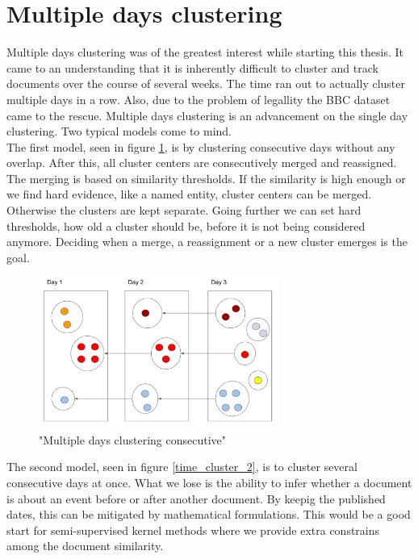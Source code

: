 \section{Multiple days clustering}
  Multiple days clustering was of the greatest interest while starting this thesis. It came to an understanding that it is inherently difficult to cluster and track documents over the course of several weeks. The time ran out to actually cluster multiple days in a row. Also, due to the problem of legallity the BBC dataset came to the rescue. Multiple days clustering is an advancement on the single day clustering. Two typical models come to mind.\\ 

  The first model, seen in figure \ref{time_cluster_1}, is by clustering consecutive days without any overlap. After this, all cluster centers are consecutively merged and reassigned. The merging is based on similarity thresholds. If the similarity is high enough or we find hard evidence, like a named entity, cluster centers can be merged. Otherwise the clusters are kept separate. Going further we can set hard thresholds, how old a cluster should be, before it is not being considered anymore. Deciding when a merge, a reassignment or a new cluster emerges is the goal.

    \begin{figure}[h!]
      \centering
        \includegraphics[width=0.7\textwidth]{time_cluster_1.png}
        \caption{"Multiple days clustering consecutive"}
        \label{time_cluster_1}
    \end{figure} 

  The second model, seen in figure \ref{time_cluster_2}, is to cluster several consecutive days at once. What we lose is the ability to infer whether a document is about an event before or after another document. By keepig the published dates, this can be mitigated by mathematical formulations. This would be a good start for semi-supervised kernel methods where we provide extra constrains among the document similarity.
    
